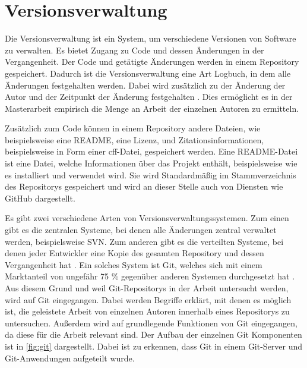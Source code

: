 \section{Versionsverwaltung}
\label{sec:versionsverwaltung}
Die Versionsverwaltung ist ein System, um verschiedene Versionen von Software zu verwalten.
Es bietet Zugang zu Code und dessen Änderungen in der Vergangenheit.
Der Code und getätigte Änderungen werden in einem Repository gespeichert.
Dadurch ist die Versionsverwaltung eine Art Logbuch, in dem alle Änderungen festgehalten werden.
Dabei wird zusätzlich zu der Änderung der Autor und der Zeitpunkt der Änderung festgehalten \autocite{ponuthorai_version_2022}.
Dies ermöglicht es in der Masterarbeit empirisch die Menge an Arbeit der einzelnen Autoren zu ermitteln.

Zusätzlich zum Code können in einem Repository andere Dateien, wie beispielsweise eine README, eine Lizenz, und Zitationsinformationen, beispielsweise in Form einer \gls{cff}-Datei, gespeichert werden.
Eine README-Datei ist eine Datei, welche Informationen über das Projekt enthält, beispielsweise wie es installiert und verwendet wird.
Sie wird Standardmäßig im Stammverzeichnis des Repositorys gespeichert und wird an dieser Stelle auch von Diensten wie GitHub dargestellt.

Es gibt zwei verschiedene Arten von Versionsverwaltungssystemen.
Zum einen gibt es die zentralen Systeme, bei denen alle Änderungen zentral verwaltet werden, beispielsweise SVN.
Zum anderen gibt es die verteilten Systeme, bei denen jeder Entwickler eine Kopie des gesamten Repository und dessen Vergangenheit hat \autocite{ponuthorai_version_2022}.
Ein solches System ist Git, welches sich mit einem Marktanteil von ungefähr 75 \% gegenüber anderen Systemen durchgesetzt hat \autocite{lindner_version_2024}.
Aus diesem Grund und weil Git-Repositorys in der Arbeit untersucht werden, wird auf Git eingegangen.
Dabei werden Begriffe erklärt, mit denen es möglich ist, die geleistete Arbeit von einzelnen Autoren innerhalb eines Repositorys zu untersuchen.
Außerdem wird auf grundlegende Funktionen von Git eingegangen, da diese für die Arbeit relevant sind.
Der Aufbau der einzelnen Git Komponenten ist in \autoref{fig:git} dargestellt.
Dabei ist zu erkennen, dass Git in einem Git-Server und Git-Anwendungen aufgeteilt wurde.

